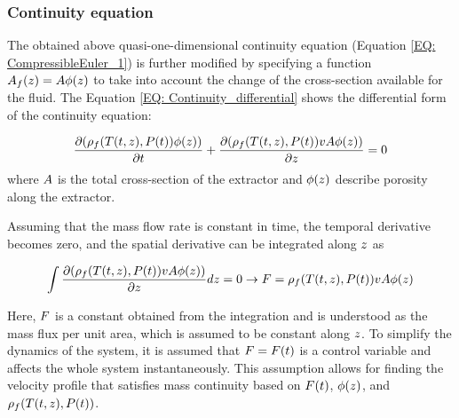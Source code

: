 \documentclass[../Article_Model_Parameters.tex]{subfiles}
\begin{document}
		
	\subsubsection{Continuity equation} \label{CH: Continuity}
	The obtained above quasi-one-dimensional continuity equation (Equation \ref{EQ: CompressibleEuler_1}) is further modified by specifying a function ${\color{black}A_f}(z) = {\color{black}A\phi}(z)$ to take into account the change of the cross-section available for the fluid. The Equation \ref{EQ: Continuity_differential} shows the differential form of the continuity equation: 
	
	{\footnotesize
		\begin{equation} \label{EQ: Continuity_differential}
			\frac{\partial ({\color{black}\rho_f}({\color{black}T}(t,z),{\color{black}P}(t)) {\color{black}\phi}(z))}{\partial t} + \frac{\partial ({\color{black}\rho_f}({\color{black}T}(t,z),{\color{black}P}(t)) v {\color{black}A\phi}(z))}{\partial {\color{black}z}} = 0
		\end{equation}
	}
	where ${\color{black} A}$ is the total cross-section of the extractor and ${\color{black}\phi}(z)$ describe porosity along the extractor.
	
	
	Assuming that the mass flow rate is constant in time, the temporal derivative becomes zero, and the spatial derivative can be integrated along ${\color{black}z}$ as
	
	{\footnotesize
		\begin{equation} \label{EQ:Velocity}
			\int \frac{\partial ({\color{black}\rho_f}({\color{black}T}(t,z),{\color{black}P}(t)) v {\color{black}A \phi}(z) )}{\partial {\color{black}z}} dz = 0 \rightarrow {\color{black}F}={\color{black}\rho_f}({\color{black}T}(t,z),{\color{black}P}(t)) v {\color{black}A\phi}(z)
		\end{equation}
	}
	
	Here, ${\color{black}F}$ is a constant obtained from the integration and is understood as the mass flux per unit area, which is assumed to be constant along ${\color{black}z}$. To simplify the dynamics of the system, it is assumed that ${\color{black}F}={\color{black}F}(t)$ is a control variable and affects the whole system instantaneously. This assumption allows for finding the velocity profile that satisfies mass continuity based on ${\color{black}F}(t)$, ${\color{black}\phi}(z)$, and ${\color{black}\rho_f}({\color{black}T}(t,z),{\color{black}P}(t))$.
	
\end{document}
